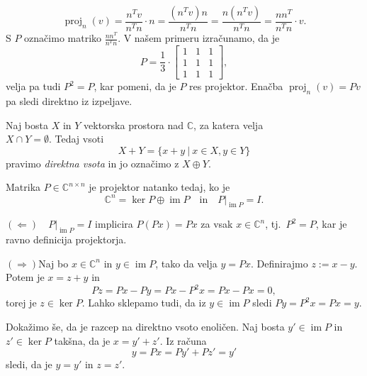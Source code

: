 \documentclass[mat1]{fmfdelo}
\newcommand{\C}{\mathbb C}
\DeclareMathOperator{\Ima}{im}
\begin{document}
\begin{zgled}
\begin{equation*}
        \operatorname{proj}_{n}(v) = \frac{n^T  v}{n^T n}\cdot n = \frac{\left(n^T  v\right)n}{n^T n} = \frac{n\left(n^T  v\right)}{n^T n} = \frac{n  n^T}{n^T n}\cdot v.
    \end{equation*}
    S $P$ označimo matriko $\frac{n  n^T}{n^T n}$. V našem primeru izračunamo, da je
    \begin{equation*}
        P = \frac{1}{3}\cdot
        \begin{bmatrix}
            1 & 1 & 1 \\
            1 & 1 & 1 \\
            1 & 1 & 1
        \end{bmatrix},
    \end{equation*}
    velja pa tudi $P^2 = P$, kar pomeni, da je $P$ res projektor. Enačba $\operatorname{proj}_n (v) = P v$ pa sledi direktno iz izpeljave.
\end{zgled}
\begin{definicija}
    Naj bosta $X$ in $Y$ vektorska prostora nad $\C$, za katera velja \\ $X \cap Y = \emptyset$. Tedaj vsoti
    \begin{equation*}
        X + Y = \{x+y \ |\ x\in X, y\in Y\}
    \end{equation*}
    pravimo \emph{direktna vsota} in jo označimo z $X \oplus Y$.
\end{definicija}
\begin{trditev}
    Matrika $P \in \C^{n \times n}$ je projektor natanko tedaj, ko je
    \begin{equation*}
        \C^n = \ker P \oplus \Ima P\quad  \text{in}\quad P|_{\Ima P} = I.
    \end{equation*}
\end{trditev}
\begin{dokaz}
    $(\Leftarrow)$$\quad P|_{\Ima P} = I$ implicira $P\left(P x\right) = P x$ za vsak $x \in \C^n$, tj.\ $P^2 = P$, kar je ravno definicija projektorja.

    $(\Rightarrow)$Naj bo $x \in \C^n$ in $y \in \Ima P$, tako da velja $y = P x$. Definirajmo $z := x-y$. Potem je $x = z + y$ in
    \begin{equation*}
        P z = P x - P y = P x - P^2 x = P x - P x = 0,
    \end{equation*}
    torej je $z\in \ker P$. Lahko sklepamo tudi, da iz $y \in \Ima P$ sledi $P y = P^2 x = P x = y$.

    Dokažimo še, da je razcep na direktno vsoto enoličen. Naj bosta $y' \in \Ima P$ in $z' \in \ker P$ takšna, da je $x = y' + z'$. Iz računa
    \begin{equation*}
        y = P x = P y' + P z' = y'
    \end{equation*}
    sledi, da je $y = y'$ in $z = z'$.
\end{dokaz}
\end{document}
